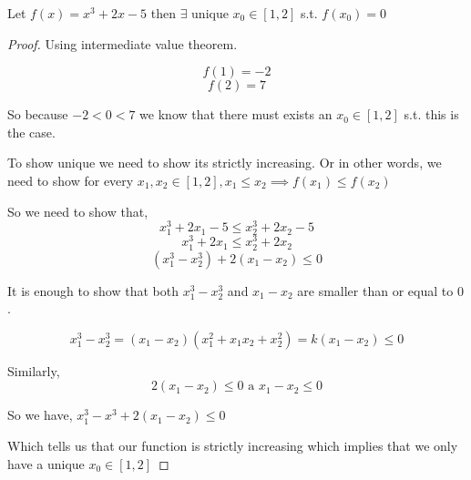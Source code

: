 \begin{eg}
    Let $f(x) = x^3 + 2x - 5$ then $\exists \text { unique }x_0 \in [1,2]$ s.t. $f(x_0) = 0$
\end{eg}
\begin{proof}
    Using intermediate value theorem.

    $$f(1) = -2$$
    $$f(2) = 7$$

    So because $-2 < 0 < 7$ we know that there must exists an $x_0 \in [1,2]$ s.t. this is the case.


    To show unique we need to show its strictly increasing. Or in other words, we need to show for every $x_1,x_2 \in [1,2], x_1 \le x_2 \implies f(x_1) \le f(x_2)$


    So we need to show that, 
    $$ x_1^3 + 2x_1 - 5 \le x_2^3 + 2x_2 - 5 $$ 
    $$ x_1^3 + 2x_1  \le x_2^3 + 2x_2 $$ 
    $$ (x_1^3 - x_2^3) + 2(x_1-x_2)  \le 0$$


    It is enough to show that both $x_1^3 - x_2^3$ and $x_1 - x_2$ are smaller than or equal to $0$.

    
    $$ x_1^3 - x_2^3 = (x_1 - x_2)(x_1^2 + x_1x_2 + x_2^2) = k (x_1 - x_2) \le 0 $$ 

    Similarly, $$2(x_1 - x_2) \le 0 \text{ a }  x_1-x_2 \le 0$$

    So we have, $x_1^3 - x^3 + 2(x_1 - x_2) \le 0$

    Which tells us that our function is strictly increasing which implies that we only have a unique $x_0 \in [1,2]$

\end{proof}


